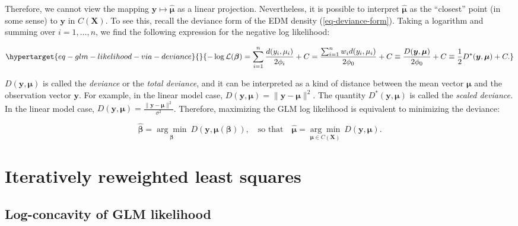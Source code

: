 \documentclass[
  11pt,
  letterpaper,
  oneside]{book}
\theoremstyle{definition}
\theoremstyle{plain}
\theoremstyle{plain}
\theoremstyle{plain}
\theoremstyle{remark}
\begin{document}
Therefore, we cannot view the mapping
\(\boldsymbol{y} \mapsto \boldsymbol{\widehat \mu}\) as a linear
projection. Nevertheless, it is possible to interpret
\(\boldsymbol{\widehat \mu}\) as the ``closest'' point (in some sense)
to \(\boldsymbol{y}\) in \(C(\boldsymbol{X})\). To see this, recall the
deviance form of the EDM density (\ref{eq-deviance-form}). Taking a
logarithm and summing over \(i = 1, \dots, n\), we find the following
expression for the negative log likelihood:

\begin{equation}\protect\hypertarget{eq-glm-likelihood-via-deviance}{}{
-\log \mathcal L(\boldsymbol{\beta}) = \sum_{i = 1}^n \frac{d(y_i, \mu_i)}{2\phi_i} + C = \frac{\sum_{i = 1}^n w_id(y_i, \mu_i)}{2\phi_0} + C  \equiv \frac{D(\boldsymbol{y}, \boldsymbol{\mu})}{2\phi_0} + C \equiv \frac12 D^*(\boldsymbol{y}, \boldsymbol{\mu}) + C.
}\label{eq-glm-likelihood-via-deviance}\end{equation}

\(D(\boldsymbol{y}, \boldsymbol{\mu})\) is called the \emph{deviance} or
the \emph{total deviance}, and it can be interpreted as a kind of
distance between the mean vector \(\boldsymbol{\mu}\) and the
observation vector \(\boldsymbol{y}\). For example, in the linear model
case,
\(D(\boldsymbol{y}, \boldsymbol{\mu}) = \|\boldsymbol{y} - \boldsymbol{\mu}\|^2\).
The quantity \(D^*(\boldsymbol{y}, \boldsymbol{\mu})\) is called the
\emph{scaled deviance.} In the linear model case,
\(D(\boldsymbol{y}, \boldsymbol{\mu}) = \frac{\|\boldsymbol{y} - \boldsymbol{\mu}\|^2}{\sigma^2}\).
Therefore, maximizing the GLM log likelihood is equivalent to minimizing
the deviance:

\[
\boldsymbol{\widehat \beta} = \underset{\boldsymbol{\beta}}{\arg \min}\ D(\boldsymbol{y}, \boldsymbol{\mu}(\boldsymbol{\beta})), \quad \text{so that} \quad \boldsymbol{\widehat \mu} = \underset{\boldsymbol{\mu} \in C(\boldsymbol{X})}{\arg \min}\ D(\boldsymbol{y}, \boldsymbol{\mu}).
\]

\hypertarget{sec-irls}{%
\section{Iteratively reweighted least squares}\label{sec-irls}}

\hypertarget{log-concavity-of-glm-likelihood}{%
\subsection{Log-concavity of GLM
likelihood}\label{log-concavity-of-glm-likelihood}}
\end{document}
